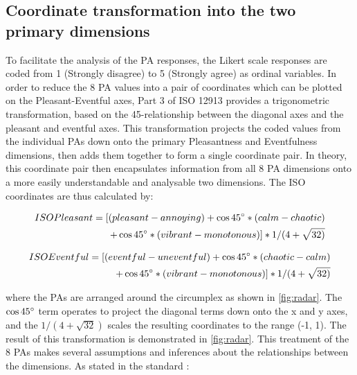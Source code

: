 \subsection{Coordinate transformation into the two primary dimensions}
To facilitate the analysis of the PA responses, the Likert scale responses are coded from 1 (Strongly disagree) to 5 (Strongly agree) as ordinal variables. In order to reduce the 8 PA values into a pair of coordinates which can be plotted on the Pleasant-Eventful axes, Part 3 of ISO 12913 \citep{ISO12913Part3} provides a trigonometric transformation, based on the 45\textdegree-relationship between the diagonal axes and the pleasant and eventful axes. This transformation projects the coded values from the individual PAs down onto the primary Pleasantness and Eventfulness dimensions, then adds them together to form a single coordinate pair. In theory, this coordinate pair then encapsulates information from all 8 PA dimensions onto a more easily understandable and analysable two dimensions. The ISO coordinates are thus calculated by:

\begin{equation}
  \begin{split}
    \label{eqn:pleasant}
    ISO Pleasant = [(pleasant - annoying) + \cos 45\degree * (calm - chaotic) \\ + \cos 45\degree * (vibrant - monotonous)] * 1/(4+\sqrt{32)}
  \end{split}
\end{equation}

\begin{equation}
  \begin{split}
    \label{eqn:eventful}
    ISO Eventful = [(eventful - uneventful) + \cos 45\degree * (chaotic - calm) \\ + \cos 45\degree * (vibrant - monotonous)] * 1/(4+\sqrt{32)}
  \end{split}
\end{equation}

where the PAs are arranged around the circumplex as shown in \cref{fig:radar}. The $\cos 45\degree$ term operates to project the diagonal terms down onto the x and y axes, and the $1 \slash (4 + \sqrt{32})$ scales the resulting coordinates to the range (-1, 1). The result of this transformation is demonstrated in \cref{fig:radar}. This treatment of the 8 PAs makes several assumptions and inferences about the relationships between the dimensions. As stated in the standard \citep[p. 5]{ISO12913Part3}:

